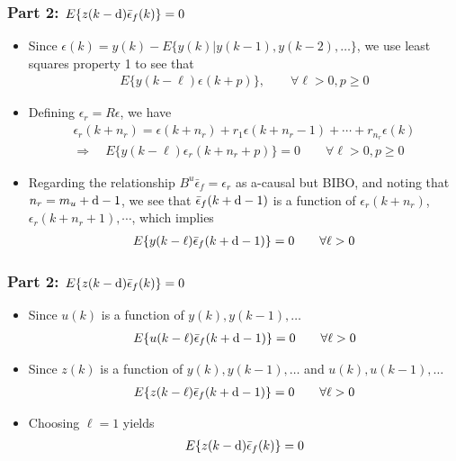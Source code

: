 \begin{frame}
    \frametitle{Part 2: $E\{z(k-\textrm{d})\bar{\epsilon}_f(k)\} = 0$}

    \begin{itemize}
        \item
        Since $\epsilon(k) = y(k) - E\{y(k) | y(k-1),y(k-2),\ldots\}$, we use least squares property 1 to see that
        \begin{align*}
            E \{ y(k-\ell) \epsilon(k+p) \}, \qquad \forall \ell > 0, p \geq 0
        \end{align*}
        \paused

        \item
        Defining $\epsilon_r = R\epsilon$, we have
        \begin{gather*}
            \epsilon_r(k+n_r) = \epsilon(k+n_r) + r_1 \epsilon(k+n_r-1)
                + \cdots + r_{n_r} \epsilon(k) \\
            \Rightarrow \quad E \{ y(k-\ell) \epsilon_r(k + n_r + p) \} = 0
                \qquad \forall \ell > 0, p \geq 0
        \end{gather*}
        \paused

        \item
        Regarding the relationship $B^u \bar{\epsilon}_f = \epsilon_r$ as a-causal but BIBO, and noting that $n_r = m_u+\textrm{d}-1$, we see that $\bar{\epsilon}_f(k+\textrm{d}-1)$ is a function of $\epsilon_r(k+n_r)$, $\epsilon_r(k+n_r+1),\cdots$, which implies
        \pause
        \begin{align*}
            E \{ y(k-\ell) \bar{\epsilon}_f(k+\textrm{d}-1) \} = 0 \qquad \forall \ell > 0
        \end{align*}
    \end{itemize}
\end{frame}

\begin{frame}
    \frametitle{Part 2: $E\{z(k-\textrm{d})\bar{\epsilon}_f(k)\} = 0$}

    \begin{itemize}
        \item
        Since $u(k)$ is a function of $y(k),y(k-1),\ldots$
        \begin{align*}
            E \{ u(k-\ell) \bar{\epsilon}_f(k+\textrm{d}-1) \} = 0 \qquad \forall \ell > 0
        \end{align*}
        \paused

        \item
        Since $z(k)$ is a function of $y(k),y(k-1),\ldots$ and $u(k),u(k-1),\ldots$
        \begin{align*}
            E \{ z(k-\ell) \bar{\epsilon}_f(k+\textrm{d}-1) \} = 0 \qquad \forall \ell > 0
        \end{align*}
        \paused

        \item
        Choosing $\ell = 1$ yields
        \begin{align*}
            E\{z(k-\textrm{d})\bar{\epsilon}_f(k)\} = 0
        \end{align*}
    \end{itemize}
\end{frame}

